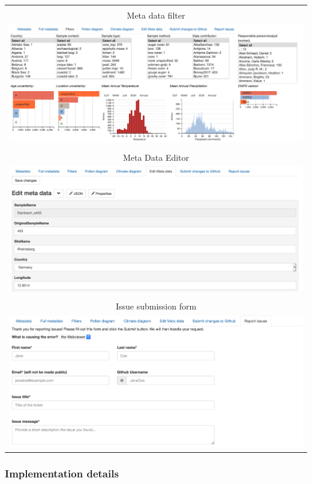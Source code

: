 \documentclass[
11pt, %
english, %
singlespacing, %
headsepline, %
]{MastersDoctoralThesis} %
\begin{document}
\begin{NoHyper}
\begin{refsection}
{\begin{longtable}{c}
		\newpage \\
		\hline
		\tabularnewline
		Meta data filter \\
		\includegraphics[width=\linewidth]{empd-figures/filter.png} \\
		\hline
		\tabularnewline
		Meta Data Editor \\
		\includegraphics[width=\linewidth]{empd-figures/meta-data-editor.png} \\
		\hline
		\tabularnewline
		Issue submission form \\
		\includegraphics[width=\linewidth]{empd-figures/issue-report.png} \\
		\hline\hline
	\end{longtable}
}

\subsubsection{Implementation details}


\end{refsection}
\end{NoHyper}
\end{document}

